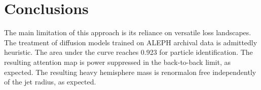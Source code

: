 \section{Conclusions}\label{sec:conclusions}

The main limitation of this approach is its reliance on versatile loss
landscapes. The treatment of diffusion models trained on ALEPH archival
data is admittedly heuristic. The area under the curve reaches 0.923 for
particle identification. The resulting attention map is power suppressed
in the back-to-back limit, as expected. The resulting heavy hemisphere
mass is renormalon free independently of the jet radius, as expected.

